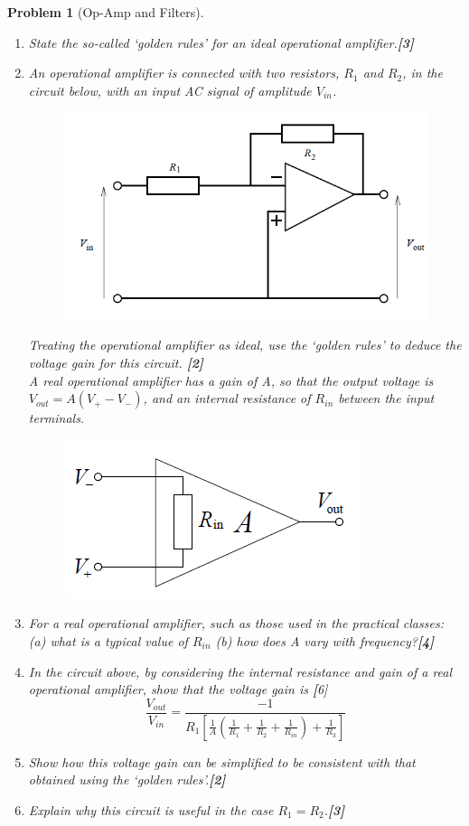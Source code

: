 \documentclass[a4paper]{article}
\theoremstyle{new}
\newtheorem{qns}{Problem}[subsection]
\begin{document}
\begin{qns}[Op-Amp and Filters]\leavevmode
\begin{enumerate}[label=(\roman*)]
\item State the so-called ‘golden rules’ for an ideal operational amplifier.\hfill\textbf{[3]}
\item An operational amplifier is connected with two resistors, $R_1$ and $R_2$, in the circuit
below, with an input AC signal of amplitude $V_{in}$.
\begin{figure}[H]
    \centering
    \includegraphics[scale=0.5]{2011P2D13Qi.PNG}
\end{figure}
Treating the operational amplifier as ideal, use the ‘golden rules’ to deduce the voltage gain for this circuit. \hfill\textbf{[2]}\\[5pt]
A real operational amplifier has a gain of A, so that the output voltage is $V_{out}=A(V_+-V_-)$, and an internal resistance of $R_{in}$ between the input terminals.
\begin{figure}[H]
    \centering
    \includegraphics[scale=0.75]{2011P2D13Qii.PNG}
\end{figure}
\item For a real operational amplifier, such as those used in the practical classes: (a)
what is a typical value of $R_{in}$ (b) how does A vary with frequency?\hfill\textbf{[4]}
\item In the circuit above, by considering the internal resistance and gain of a real operational amplifier, show that the voltage gain is \hfill\textbf[6]
$$\frac{V_{out}}{V_{in}}=\frac{-1}{R_1[\frac{1}{A}(\frac{1}{R_1}+\frac{1}{R_2}+\frac{1}{R_{in}})+\frac{1}{R_3}]}$$
\item Show how this voltage gain can be simplified to be consistent with that obtained using the ‘golden rules’.\hfill\textbf{[2]}
\item Explain why this circuit is useful in the case $R_1 = R_2$.\hfill\textbf{[3]}
\end{enumerate}
\end{qns}
\end{document}
